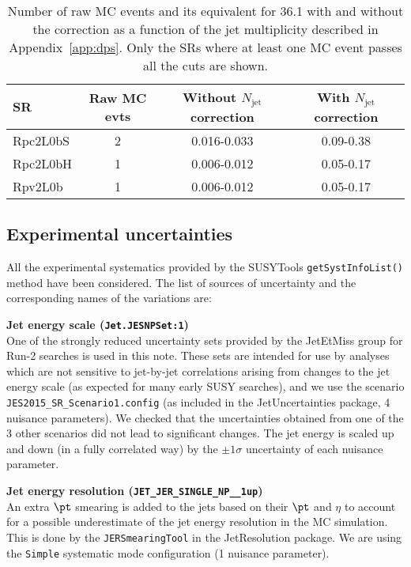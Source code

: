 \begin{table}[!htb]
\caption{Number of raw MC events and its equivalent for 36.1 \ifb with and without the correction as a function of the jet multiplicity described in Appendix~\ref{app:dps}. Only the SRs where at least one MC event passes all the cuts are shown.}
\label{tab:DPS_SR}
\centering
\begin{tabular}{l|c|c|c}
\hline
SR       & Raw MC evts & Without $N_{\text{jet}}$ correction & With $N_{\text{jet}}$ correction \\\hline
Rpc2L0bS & 2 & 0.016-0.033 & 0.09-0.38 \\ 
Rpc2L0bH & 1 & 0.006-0.012 & 0.05-0.17 \\ 
Rpv2L0b  & 1 & 0.006-0.012 & 0.05-0.17 \\ 
\hline
\end{tabular}
\end{table}



\subsection{Experimental uncertainties}
\label{subsec:promptbkg_expsyst}

All the  experimental systematics provided by the SUSYTools {\tt getSystInfoList()} method have been considered. 
The list of sources of uncertainty and the corresponding names of the variations are:

\textbf{Jet energy scale ({\tt{Jet.JESNPSet:1}})}  \\  
One of the strongly reduced uncertainty sets provided by the JetEtMiss group for Run-2 searches is used in this note. 
These sets are intended for use by analyses which are not sensitive to jet-by-jet correlations arising from changes to the jet energy scale 
(as expected for many early SUSY searches), 
and we use the scenario {\tt JES2015\_SR\_Scenario1.config} (as included in the JetUncertainties package, 4 nuisance parameters). 
We checked that the uncertainties obtained from one of the 3 other scenarios did not lead to significant changes. 
The jet energy is scaled up and down (in a fully correlated way) by the $\pm 1\sigma$ uncertainty of each nuisance parameter.

\textbf{Jet energy resolution ({\tt{JET\_JER\_SINGLE\_NP\_\_1up}})} \\ %
An extra $\pt$ smearing is added to the jets based on their $\pt$ and $\eta$ to account for a possible underestimate of the jet energy resolution in the MC simulation. This is done by the {\tt JERSmearingTool} in the JetResolution package. We are using the {\tt Simple} systematic mode configuration (1 nuisance parameter). 


